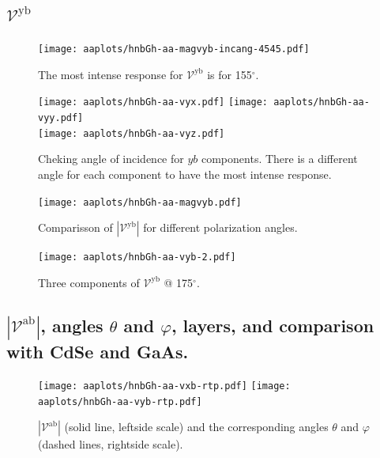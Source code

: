 \documentclass{article}
\let\Oldsubsection\subsection
\renewcommand{\subsection}{\FloatBarrier\Oldsubsection}
\begin{document}
\clearpage

\subsection{$\mathcal{V}^{\mathrm{yb}} $}
\begin{figure}[h!]
    \centering
    \texttt{[image: aaplots/hnbGh-aa-magvyb-incang-4545.pdf]}
    \caption{The most intense response for $\mathcal{V}^{\mathrm{yb}} $ is for 
    155$^{\circ}$.}
    \label{fig:aa-magvybincang}
\end{figure}
\begin{figure}[h!]
    \centering
    \texttt{[image: aaplots/hnbGh-aa-vyx.pdf]}
    \texttt{[image: aaplots/hnbGh-aa-vyy.pdf]}\\
    \texttt{[image: aaplots/hnbGh-aa-vyz.pdf]}
    \caption{Cheking angle of incidence for $yb$ components. There is a
    different angle for each component to have the most intense response.}
    \label{fig:aa-ybangcomp}
\end{figure}
\begin{figure}[ht!]
    \centering
    \texttt{[image: aaplots/hnbGh-aa-magvyb.pdf]}
    \caption{Comparisson of $|\mathcal{V}^{\mathrm{yb}}|$ for different
    polarization angles.}
    \label{fig:aa-magvyb}
\end{figure}
\begin{figure}[t!]
    \centering
    \texttt{[image: aaplots/hnbGh-aa-vyb-2.pdf]}
    \caption{Three components of $\mathcal{V}^{\mathrm{yb}} $ @ 175$^{\circ}$.}
    \label{fig:aa-vyb2}
\end{figure}

\clearpage

\subsection{$|\mathcal{V}^{\mathrm{ab}}|$, angles
$\theta$ and $\varphi$, layers, and comparison with CdSe and GaAs.}
\begin{figure}[ht]
    \centering
    \texttt{[image: aaplots/hnbGh-aa-vxb-rtp.pdf]}
    \texttt{[image: aaplots/hnbGh-aa-vyb-rtp.pdf]}
    \caption{$|\mathcal{V}^{\mathrm{ab}}|$ (solid line, leftside scale) and the
    corresponding angles $\theta$ and $\varphi$ (dashed lines, rightside scale).}
    \label{fig:aa-rtp}
\end{figure}
\end{document}
